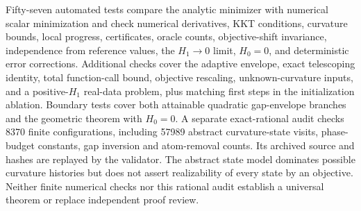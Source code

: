 \documentclass[11pt]{article}
\begin{document}
Fifty-seven automated tests compare the analytic minimizer with numerical
scalar minimization and check numerical derivatives, KKT conditions,
curvature bounds, local progress, certificates, oracle counts,
objective-shift invariance, independence from reference values, the
$H_1\to0$ limit, $H_0=0$, and deterministic error corrections.
Additional checks cover the adaptive envelope, exact telescoping identity,
total function-call bound, objective rescaling, unknown-curvature inputs,
and a positive-$H_1$ real-data problem, plus matching first steps in the
initialization ablation. Boundary tests cover both attainable quadratic
gap-envelope branches and the geometric theorem with $H_0=0$.
A separate exact-rational audit checks 8370 finite configurations,
including 57989 abstract curvature-state visits, phase-budget constants,
gap inversion and atom-removal counts. Its archived source and hashes
are replayed by the validator. The abstract state model dominates
possible curvature histories but does not assert realizability of
every state by an objective. Neither finite numerical checks nor this
rational audit establish a universal theorem or replace independent
proof review.









\end{document}
